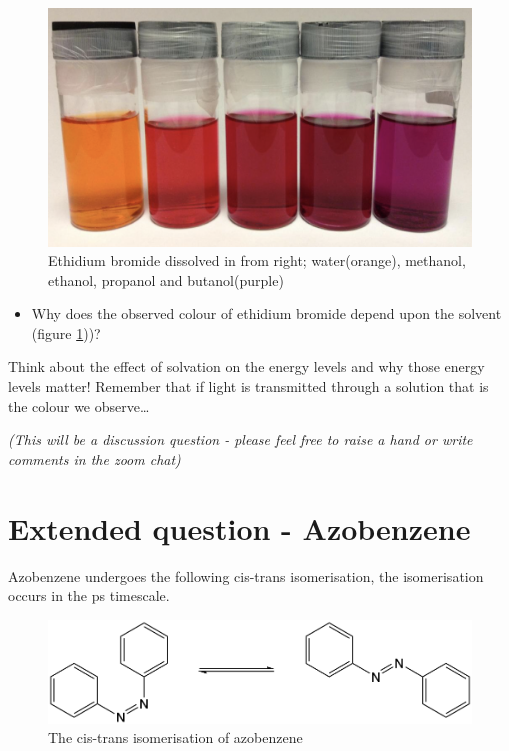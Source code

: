 \documentclass[
]{book}
\providecommand{\tightlist}{%
  \setlength{\itemsep}{0pt}\setlength{\parskip}{0pt}}
\begin{document}
\begin{figure}

{\centering \includegraphics[width=0.7\linewidth]{images/ethidium} 

}

\caption{Ethidium bromide dissolved in from right; water(orange), methanol, ethanol, propanol and butanol(purple)}\label{fig:ethidium}
\end{figure}

\begin{itemize}
\tightlist
\item
  Why does the observed colour of ethidium bromide depend upon the solvent (figure \ref{fig:ethidium}))?
\end{itemize}

Think about the effect of solvation on the energy levels and why those energy levels matter! Remember that if light is transmitted through a solution that is the colour we observe\ldots{}

\emph{(This will be a discussion question - please feel free to raise a hand or write comments in the zoom chat)}

\hypertarget{sec:Azobenzene}{%
\section{Extended question - Azobenzene}\label{sec:Azobenzene}}

Azobenzene undergoes the following cis-trans isomerisation, the isomerisation occurs in the ps timescale.

\begin{figure}

{\centering \includegraphics[width=0.7\linewidth]{images/cistransazobenzene} 

}

\caption{The cis-trans isomerisation of azobenzene}\label{fig:cistransazobenzene}
\end{figure}
\end{document}
